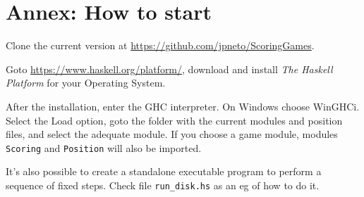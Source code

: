 \documentclass[a4paper,12pt]{article}
\begin{document}
\newpage \section{Annex: How to start}

Clone the current version at \url{https://github.com/jpneto/ScoringGames}.

Goto \url{https://www.haskell.org/platform/}, download and install \textit{The Haskell Platform} 
for your Operating System. 

After the installation, enter the GHC interpreter. On Windows choose WinGHCi. Select the Load option, goto the folder with the current modules and position files, and select the adequate module. If you choose a game module, modules \verb!Scoring! and \verb!Position! will also be imported.

It's also possible to create a standalone executable program to perform a sequence of fixed steps. Check file \verb!run_disk.hs! as an eg of how to do it.
\end{document}
